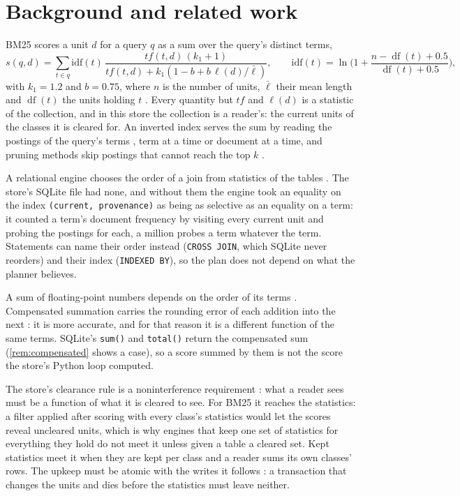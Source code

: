 \documentclass[11pt]{article}
\theoremstyle{plain}
\theoremstyle{definition}
\theoremstyle{remark}
\newcommand{\code}[1]{\texttt{#1}}
\newcommand{\df}{\operatorname{df}}
\begin{document}
\section{Background and related work}\label{sec:background}

BM25 scores a unit $d$ for a query $q$ as a sum over the query's distinct terms,
\[
  s(q, d) = \sum_{t \in q} \mathrm{idf}(t)\,
            \frac{\mathit{tf}(t, d)\,(k_1 + 1)}{\mathit{tf}(t, d) + k_1 (1 - b + b\,\ell(d)/\bar\ell)},
  \qquad
  \mathrm{idf}(t) = \ln\!\Big(1 + \frac{n - \df(t) + 0.5}{\df(t) + 0.5}\Big),
\]
with $k_1 = 1.2$ and $b = 0.75$, where $n$ is the number of units, $\bar\ell$ their mean length and
$\df(t)$ the units holding $t$ \citep{robertson2009bm25}. Every quantity but $\mathit{tf}$ and
$\ell(d)$ is a statistic of the collection, and in this store the collection is a reader's: the
current units of the classes it is cleared for. An inverted index serves the sum by reading the
postings of the query's terms \citep{zobel2006inverted}, term at a time or document at a time, and
pruning methods skip postings that cannot reach the top $k$ \citep{turtle1995query}.

A relational engine chooses the order of a join from statistics of the tables
\citep{selinger1979access}. The store's SQLite file had none, and without them the engine took an
equality on the index \code{(current, provenance)} as being as selective as an equality on a term:
it counted a term's document frequency by visiting every current unit and probing the postings for
each, a million probes a term whatever the term. Statements can name their order instead
(\code{CROSS JOIN}, which SQLite never reorders) and their index (\code{INDEXED BY}), so the plan
does not depend on what the planner believes.

A sum of floating-point numbers depends on the order of its terms
\citep{ieee754-2019,higham1993accuracy}. Compensated summation carries the rounding error of each
addition into the next \citep{kahan1965further,neumaier1974rundungsfehler}: it is more accurate,
and for that reason it is a different function of the same terms. SQLite's \code{sum()} and
\code{total()} return the compensated sum (\cref{rem:compensated} shows a case), so a score summed
by them is not the score the store's Python loop computed.

The store's clearance rule is a noninterference requirement \citep{goguen1982security}: what a
reader sees must be a function of what it is cleared to see. For BM25 it reaches the statistics: a
filter applied after scoring with every class's statistics would let the scores reveal uncleared
units, which is why engines that keep one set of statistics for everything they hold do not meet
it unless given a table a cleared set. Kept statistics meet it when they are kept per class and a
reader sums its own classes' rows. The upkeep must be atomic with the writes it follows
\citep{haerder1983principles}: a transaction that changes the units and dies before the
statistics must leave neither.
\end{document}
